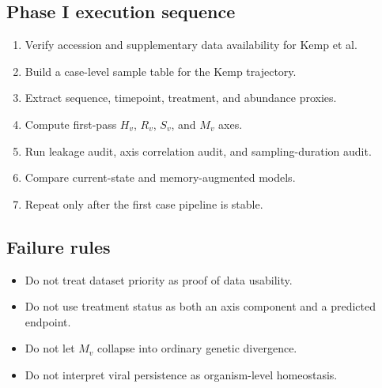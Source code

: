 \subsection*{Phase I execution sequence}
\begin{enumerate}
\item Verify accession and supplementary data availability for Kemp et al.
\item Build a case-level sample table for the Kemp trajectory.
\item Extract sequence, timepoint, treatment, and abundance proxies.
\item Compute first-pass \(H_v\), \(R_v\), \(S_v\), and \(M_v\) axes.
\item Run leakage audit, axis correlation audit, and sampling-duration audit.
\item Compare current-state and memory-augmented models.
\item Repeat only after the first case pipeline is stable.
\end{enumerate}

\subsection*{Failure rules}
\begin{itemize}
\item Do not treat dataset priority as proof of data usability.
\item Do not use treatment status as both an axis component and a predicted endpoint.
\item Do not let \(M_v\) collapse into ordinary genetic divergence.
\item Do not interpret viral persistence as organism-level homeostasis.
\end{itemize}